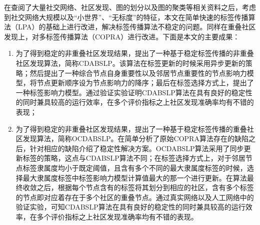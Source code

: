 

\begin{conclusion}


在查阅了大量社交网络、社区发现、图的划分以及图的聚类等相关资料之后，考虑到社交网络大规模以及“小世界”、“无标度”的特征，本文在简单快速的标签传播算法（LPA）的基础上进行改进，解决标签传播算法不稳定的问题。同样在重叠社区发现上，对多标签传播算法（COPRA）进行改进。下面是本文的主要成果：
\begin{enumerate}
    \item 为了得到稳定的非重叠社区发现结果，提出了一种基于稳定标签传播的非重叠社区发现算法，简称CDABSLP。该算法在标签更新的时候采用异步更新的策略；然后提出了一种综合节点自身重要性以及邻居节点重要性的节点影响力模型，将节点更新顺序设为节点影响力的降序；最后在标签选择方式上，提出了一种标签影响力模型。通过验证实验证明CDABSLP算法在具有良好的稳定性的同时兼具较高的运行效率，在多个评价指标之上社区发现准确率均有不错的表现；
    \item 为了得到稳定的非重叠社区发现结果，提出了一种基于稳定标签传播的重叠社区发现算法，简称OCDABSLP。在简单分析了原始COPRA算法存在的缺陷之后，针对相应的缺陷介绍了稳定性解决方案。OCDABSLP算法采用了同步更新标签的策略，这点与CDABSLP算法不同；在标签选择方式上，对于邻居节点标签隶属度均小于既定阈值，且含有多个不同的最大隶属度标签的时候，选择最大隶属度标签中标签影响力模型计算值最大的那一个进行更新。在算法最终收敛之后，根据每个节点含有的标签将其划分到相应的社区，含有多个标签的节点即对应着存在于多个社区的重叠节点。通过真实网络以及人工网络中的验证实验，可知CDABSLP算法在具有良好的稳定性的同时兼具较高的运行效率，在多个评价指标之上社区发现准确率均有不错的表现。
\end{enumerate}



\end{conclusion}
